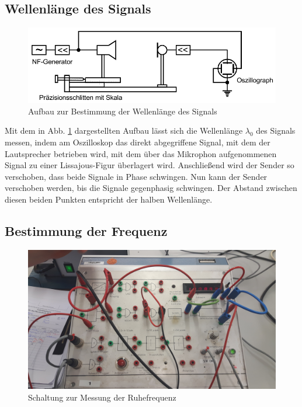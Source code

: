 \subsection{Wellenlänge des Signals}
\label{sec:Wellenlänge}
\begin{figure}
  \centering
  \includegraphics[width = \textwidth]{./Abbildungen/Schallgeschwindigkeit.PNG}
  \caption{Aufbau zur Bestimmung der Wellenlänge des Signals}
  \label{fig:Wellenlänge}
\end{figure}

Mit dem in Abb. \ref{fig:Wellenlänge} dargestellten Aufbau lässt sich die Wellenlänge $\lambda_0$ des Signals messen, indem am Oszilloskop das direkt abgegriffene Signal, mit dem der Lautsprecher betrieben wird, mit dem über das Mikrophon aufgenommenen Signal zu einer Lissajous-Figur überlagert wird. Anschließend wird der Sender so verschoben, dass beide Signale in Phase schwingen. Nun kann der Sender verschoben werden, bis die Signale gegenphasig schwingen. Der Abstand zwischen diesen beiden Punkten entspricht der halben Wellenlänge.
\FloatBarrier

\subsection{Bestimmung der Frequenz}
\label{sec:Frequenz}

\begin{figure}
  \centering
  \includegraphics[width = \textwidth]{./Abbildungen/Frequenzmessung.jpg}
  \caption{Schaltung zur Messung der Ruhefrequenz}
  \label{fig:Ruhefrequenz}
\end{figure}

